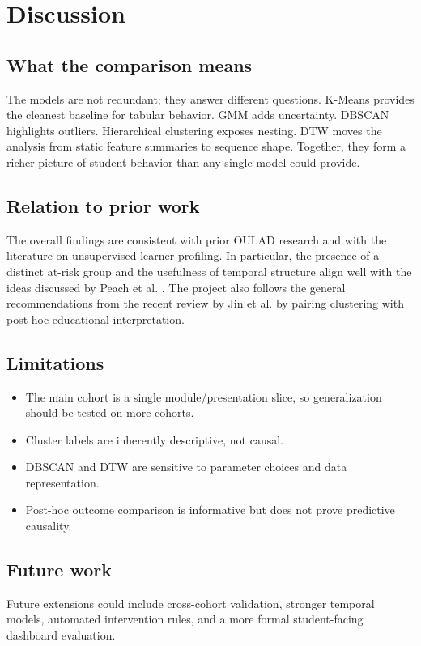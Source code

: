 \documentclass[11pt,a4paper]{article}
\begin{document}
\section{Discussion}
\subsection{What the comparison means}
The models are not redundant; they answer different questions. K-Means provides the cleanest baseline for tabular behavior. GMM adds uncertainty. DBSCAN highlights outliers. Hierarchical clustering exposes nesting. DTW moves the analysis from static feature summaries to sequence shape. Together, they form a richer picture of student behavior than any single model could provide.

\subsection{Relation to prior work}
The overall findings are consistent with prior OULAD research and with the literature on unsupervised learner profiling. In particular, the presence of a distinct at-risk group and the usefulness of temporal structure align well with the ideas discussed by Peach et al. \citep{peach2019unsupervised}. The project also follows the general recommendations from the recent review by Jin et al. \citep{jin2024review} by pairing clustering with post-hoc educational interpretation.

\subsection{Limitations}
\begin{itemize}[leftmargin=*]
  \item The main cohort is a single module/presentation slice, so generalization should be tested on more cohorts.
  \item Cluster labels are inherently descriptive, not causal.
  \item DBSCAN and DTW are sensitive to parameter choices and data representation.
  \item Post-hoc outcome comparison is informative but does not prove predictive causality.
\end{itemize}

\subsection{Future work}
Future extensions could include cross-cohort validation, stronger temporal models, automated intervention rules, and a more formal student-facing dashboard evaluation.
\end{document}
